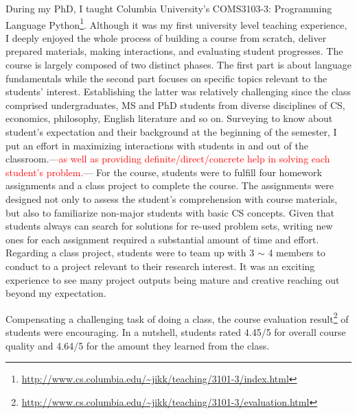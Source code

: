 \documentclass[letterpaper, 10pt]{article}
\newcommand{\jikk}[1]{{---\textcolor{red}{#1}---}}
\newcommand{\jikk}[1]{}
\begin{document}
\begin{small}
During my PhD, I taught Columbia University's COMS3103-3: Programming Language
Python\footnote{\url{http://www.cs.columbia.edu/~jikk/teaching/3101-3/index.html}}.
%
%
Although it was my first university level teaching experience, I deeply enjoyed
the whole process of building a course from scratch, deliver prepared
materials, making interactions, and evaluating student progresses.
% 
The course is largely composed of two distinct phases. The first part is about
language fundamentals while the second part focuses on specific topics relevant
to the students' interest. Establishing the latter was relatively challenging
since the class comprised undergraduates, MS and PhD students from diverse
disciplines of CS, economics, philosophy, English literature and so on.
%
Surveying to know about student's expectation and their background at the
beginning of the semester, I put an effort in maximizing interactions with
students in and out of the classroom.\jikk{as well as providing
definite/direct/concrete help in solving each student's problem.}
% 
For the course, students were to fulfill four homework assignments and a class
project to complete the course. 
%
The assignments were designed not only to assess the student's comprehension
with course materials, but also to familiarize non-major students with basic CS
concepts.
%
%
Given that students always can search for solutions for re-used problem sets,
writing new ones for each assignment required a substantial amount of time and
effort. 
%
Regarding a class project, students were to team up with 3 $\sim$ 4 members to
conduct to a project relevant to their research interest.
%
It was an exciting experience to see many project outputs being mature and
creative reaching out beyond my expectation.
%
%

Compensating a challenging task of doing a class, the course evaluation
result\footnote{\url{http://www.cs.columbia.edu/~jikk/teaching/3101-3/evaluation.html}}
of students were encouraging. In a nutshell, students rated 4.45/5 for
overall course quality and 4.64/5 for the amount they learned from the class.

\vspace{-2pt}

\end{small}
\end{document}
